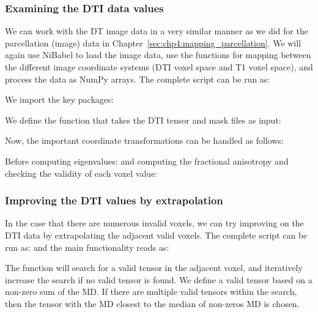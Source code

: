 \subsubsection*{Examining the DTI data values}

We can work with the DT image data in a very similar manner as we did
for the parcellation (image) data in
Chapter~\ref{sec:chp4:mapping_parcellation}. We will again use NiBabel
to load the image data, use the  functions for mapping
between the different image coordinate systems (DTI voxel space and T1
voxel space), and process the data as NumPy arrays. The complete
script can be run as:

We import the key packages:

\noindent We define the function  that takes the DTI
tensor and mask files as input: 

\noindent Now, the important coordinate transformations can be handled as follows:

\noindent Before computing eigenvalues:
and computing the fractional anisotropy and checking the validity of each voxel value:

\subsubsection*{Improving the DTI values by extrapolation}

In the case that there are numerous invalid voxels, we can try
improving on the DTI data by extrapolating the adjacent valid
voxels. The complete
script can be run as:
\noindent and the main functionality reads as:

The function  will search for a valid
tensor in the adjacent voxel, and iteratively increase the search if
no valid tensor is found. We define a valid tensor
based on a non-zero sum of the MD. If there are multiple valid tensors within
the search, then the tensor with the MD closest to the median of non-zeros MD is
chosen.

